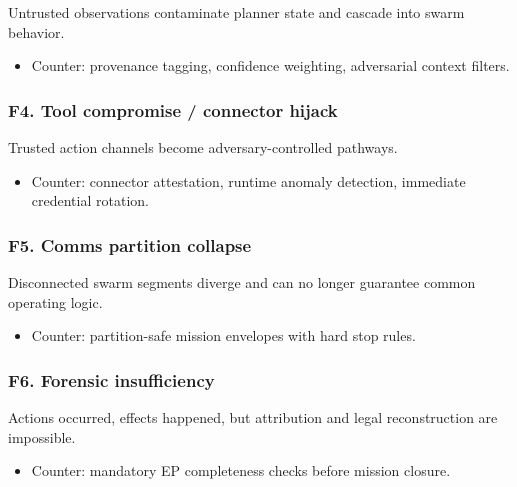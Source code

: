 \documentclass[
]{article}
\providecommand{\tightlist}{%
  \setlength{\itemsep}{0pt}\setlength{\parskip}{0pt}}
\begin{document}
Untrusted observations contaminate planner state and cascade into swarm
behavior.

\begin{itemize}
\tightlist
\item
  Counter: provenance tagging, confidence weighting, adversarial context
  filters.
\end{itemize}

\hypertarget{f4.-tool-compromise-connector-hijack}{%
\subsubsection{F4. Tool compromise / connector
hijack}\label{f4.-tool-compromise-connector-hijack}}

Trusted action channels become adversary-controlled pathways.

\begin{itemize}
\tightlist
\item
  Counter: connector attestation, runtime anomaly detection, immediate
  credential rotation.
\end{itemize}

\hypertarget{f5.-comms-partition-collapse}{%
\subsubsection{F5. Comms partition
collapse}\label{f5.-comms-partition-collapse}}

Disconnected swarm segments diverge and can no longer guarantee common
operating logic.

\begin{itemize}
\tightlist
\item
  Counter: partition-safe mission envelopes with hard stop rules.
\end{itemize}

\hypertarget{f6.-forensic-insufficiency}{%
\subsubsection{F6. Forensic
insufficiency}\label{f6.-forensic-insufficiency}}

Actions occurred, effects happened, but attribution and legal
reconstruction are impossible.

\begin{itemize}
\tightlist
\item
  Counter: mandatory EP completeness checks before mission closure.
\end{itemize}
\end{document}
